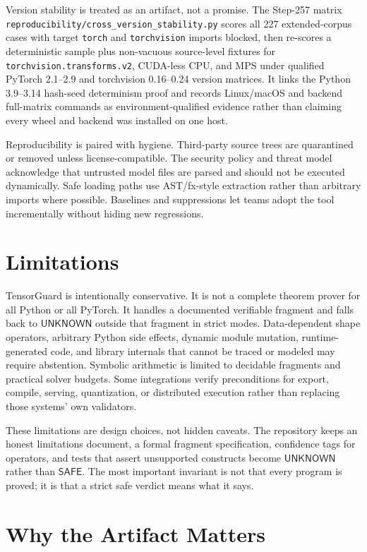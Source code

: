 \documentclass[11pt]{article}
\newcommand{\tg}{TensorGuard}
\newcommand{\unknown}{\ensuremath{\mathsf{UNKNOWN}}}
\newcommand{\safe}{\ensuremath{\mathsf{SAFE}}}
\begin{document}
Version stability is treated as an artifact, not a promise.  The Step-257
matrix \texttt{reproducibility/cross\_version\_stability.py} scores all 227
extended-corpus cases with target \texttt{torch} and \texttt{torchvision} imports
blocked, then re-scores a deterministic sample plus non-vacuous source-level
fixtures for \texttt{torchvision.transforms.v2}, CUDA-less CPU, and MPS under
qualified PyTorch 2.1--2.9 and torchvision 0.16--0.24 version matrices.  It
links the Python 3.9--3.14 hash-seed determinism proof and records Linux/macOS
and backend full-matrix commands as environment-qualified evidence rather than
claiming every wheel and backend was installed on one host.

Reproducibility is paired with hygiene.  Third-party source trees are
quarantined or removed unless license-compatible.  The security policy and
threat model acknowledge that untrusted model files are parsed and should not
be executed dynamically.  Safe loading paths use AST/fx-style extraction rather
than arbitrary imports where possible.  Baselines and suppressions let teams
adopt the tool incrementally without hiding new regressions.

\clearpage

\section{Limitations}

\tg{} is intentionally conservative.  It is not a complete theorem prover for
all Python or all PyTorch.  It handles a documented verifiable fragment and
falls back to \unknown{} outside that fragment in strict modes.  Data-dependent
shape operators, arbitrary Python side effects, dynamic module mutation,
runtime-generated code, and library internals that cannot be traced or modeled
may require abstention.  Symbolic arithmetic is limited to decidable fragments
and practical solver budgets.  Some integrations verify preconditions for
export, compile, serving, quantization, or distributed execution rather than
replacing those systems' own validators.

These limitations are design choices, not hidden caveats.  The repository keeps
an honest limitations document, a formal fragment specification, confidence
tags for operators, and tests that assert unsupported constructs become
\unknown{} rather than \safe{}.  The most important invariant is not that every
program is proved; it is that a strict safe verdict means what it says.

\section{Why the Artifact Matters}
\end{document}
